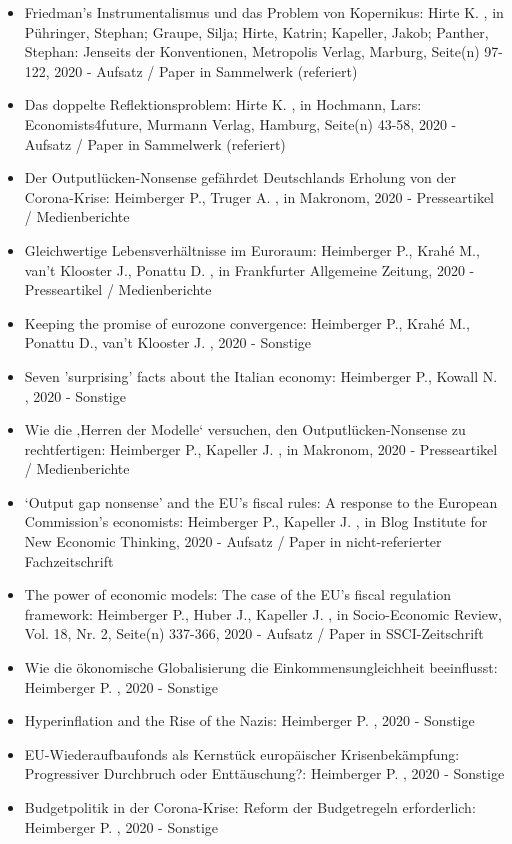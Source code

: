 \begin{itemize}
	 \item Friedman’s Instrumentalismus und das Problem von Kopernikus: Hirte K. , in Pühringer, Stephan; Graupe, Silja; Hirte, Katrin; Kapeller, Jakob; Panther, Stephan: Jenseits der Konventionen, Metropolis Verlag, Marburg, Seite(n) 97-122, 2020 - Aufsatz / Paper in Sammelwerk (referiert)
	 \item Das doppelte Reflektionsproblem: Hirte K. , in Hochmann, Lars: Economists4future, Murmann Verlag, Hamburg, Seite(n) 43-58, 2020 - Aufsatz / Paper in Sammelwerk (referiert)
	 \item Der Outputlücken-Nonsense gefährdet Deutschlands Erholung von der Corona-Krise: Heimberger P., Truger A. , in Makronom, 2020 - Presseartikel / Medienberichte
	 \item Gleichwertige Lebensverhältnisse im Euroraum: Heimberger P., Krahé M., van't Klooster J., Ponattu D. , in Frankfurter Allgemeine Zeitung, 2020 - Presseartikel / Medienberichte
	 \item Keeping the promise of eurozone convergence: Heimberger P., Krahé M., Ponattu D., van't Klooster J. , 2020 - Sonstige
	 \item Seven ’surprising’ facts about the Italian economy: Heimberger P., Kowall N. , 2020 - Sonstige
	 \item Wie die ‚Herren der Modelle‘ versuchen, den Outputlücken-Nonsense zu rechtfertigen: Heimberger P., Kapeller J. , in Makronom, 2020 - Presseartikel / Medienberichte
	 \item ‘Output gap nonsense’ and the EU’s fiscal rules: A response to the European Commission’s economists: Heimberger P., Kapeller J. , in Blog Institute for New Economic Thinking, 2020 - Aufsatz / Paper in nicht-referierter Fachzeitschrift
	 \item The power of economic models: The case of the EU's fiscal regulation framework: Heimberger P., Huber J., Kapeller J. , in Socio-Economic Review, Vol. 18, Nr. 2, Seite(n) 337-366, 2020 - Aufsatz / Paper in SSCI-Zeitschrift
	 \item Wie die ökonomische Globalisierung die Einkommensungleichheit beeinflusst: Heimberger P. , 2020 - Sonstige
	 \item Hyperinflation and the Rise of the Nazis: Heimberger P. , 2020 - Sonstige
	 \item EU-Wiederaufbaufonds als Kernstück europäischer Krisenbekämpfung: Progressiver Durchbruch oder Enttäuschung?: Heimberger P. , 2020 - Sonstige
	 \item Budgetpolitik in der Corona-Krise: Reform der Budgetregeln erforderlich: Heimberger P. , 2020 - Sonstige

\end{itemize}

